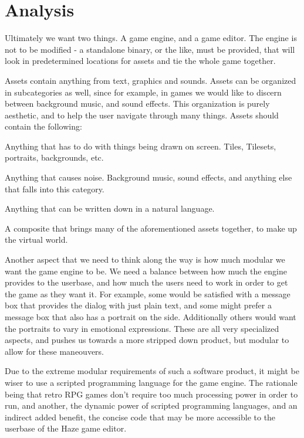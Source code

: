 \section{Analysis}

Ultimately we want two things. A game engine, and a game editor. The engine is
not to be modified - a standalone binary, or the like, must be provided, that
will look in predetermined locations for assets and tie the whole game
together.

Assets contain anything from text, graphics and sounds. Assets can be organized
in subcategories as well, since for example, in games we would like to discern
between background music, and sound effects. This organization is purely
aesthetic, and to help the user navigate through many things. Assets should
contain the following:

\begin{description}
   Anything that has to do with things being drawn on screen.
    Tiles, Tilesets, portraits, backgrounds, etc.

   Anything that causes noise. Background music, sound effects, and
    anything else that falls into this category.

   Anything that can be written down in a natural language.

   A composite that brings many of the aforementioned assets
    together, to make up the virtual world.
\end{description}

Another aspect that we need to think along the way is how much modular we want
the game engine to be. We need a balance between how much the engine provides
to the userbase, and how much the users need to work in order to get the game
as they want it. For example, some would be satisfied with a message box that
provides the dialog with just plain text, and some might prefer a message box
that also has a portrait on the side. Additionally others would want the
portraits to vary in emotional expressions. These are all very specialized
aspects, and pushes us towards a more stripped down product, but modular to
allow for these maneouvers.

Due to the extreme modular requirements of such a software product, it might be
wiser to use a scripted programming language for the game engine. The rationale
being that retro RPG games don't require too much processing power in order to
run, and another, the dynamic power of scripted programming languages, and an
indirect added benefit, the concise code that may be more accessible to the
userbase of the Haze game editor.

